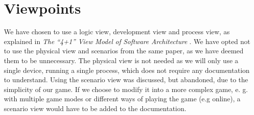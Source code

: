 \chapter{Viewpoints}
We have chosen to use a logic view, development view and process view, as explained in \textit{The “4+1” View Model of Software Architecture} \cite{krutchen}. We have opted not to use the physical view and scenarios from the same paper, as we have deemed them to be unnecessary. The physical view is not needed as we will only use a single device, running a single process, which does not require any documentation to understand. Using the scenario view was discussed, but abandoned, due to the simplicity of our game. If we choose to modify it into a more complex game, e. g. with multiple game modes or different ways of playing the game (e.g online), a scenario view would have to be added to the documentation. 